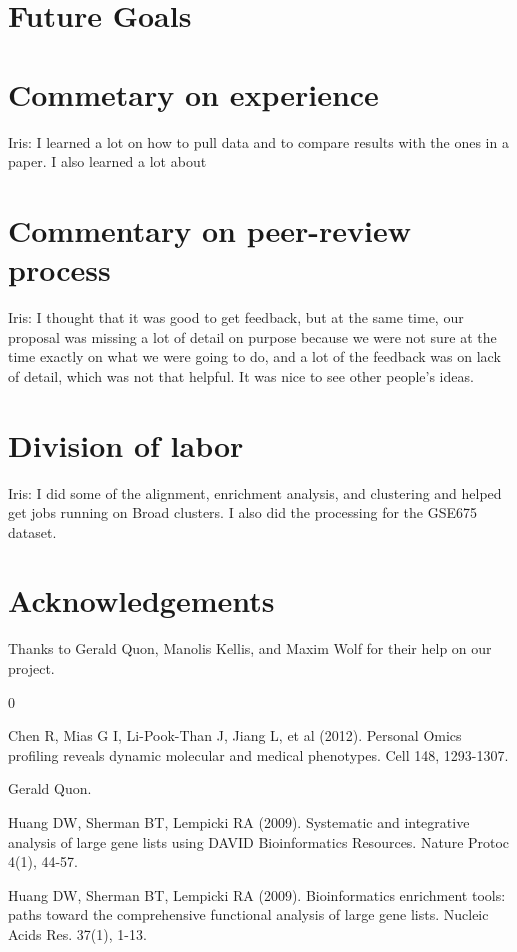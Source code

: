 \documentclass[aps,prd,final,onecolumn,a4paper,10pt]{revtex4}
\begin{document}
\section{Future Goals}

\section{Commetary on experience}
Iris: I learned a lot on how to pull data and to compare results with the ones in a paper. I also learned a lot about

\section{Commentary on peer-review process}
Iris: I thought that it was good to get feedback, but at the same time, our proposal was missing a lot of detail on purpose because we were not sure at the time exactly on what we were going to do, and a lot of the feedback was on lack of detail, which was not that helpful. It was nice to see other people's ideas.

\section{Division of labor}

Iris: I did some of the alignment, enrichment analysis, and clustering and helped get jobs running on Broad clusters. I also did the processing for the GSE675 dataset.

\section{Acknowledgements}
Thanks to Gerald Quon, Manolis Kellis, and Maxim Wolf for their help on our project.

\begin{thebibliography} {0}

 Chen R, Mias G I, Li-Pook-Than J, Jiang L, et al (2012). Personal Omics profiling reveals dynamic molecular and medical phenotypes. Cell 148, 1293-1307.

 Gerald Quon.

 Huang DW, Sherman BT, Lempicki RA (2009). Systematic and integrative analysis of large gene lists using DAVID Bioinformatics Resources. Nature Protoc 4(1), 44-57.

 Huang DW, Sherman BT, Lempicki RA (2009). Bioinformatics enrichment tools: paths toward the comprehensive functional analysis of large gene lists. Nucleic Acids Res. 37(1), 1-13.


\end{thebibliography}
\end{document}
